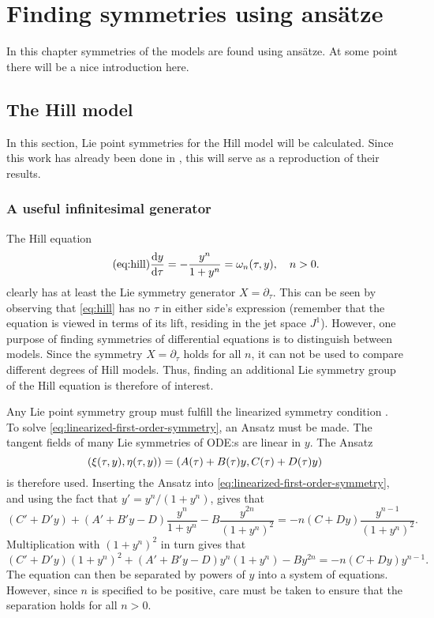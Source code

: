 \chapter{Finding symmetries using ansätze}

In this chapter symmetries of the models are found using ansätze.
At some point there will be a nice introduction here.

\section{The Hill model}

In this section, Lie point symmetries for the Hill model will be calculated.
Since this work has already been done in \cite{ohlsson2020symmetry}, this will serve as a reproduction of their results.

\subsection{A useful infinitesimal generator}

The Hill equation
\begin{equation} \tag{eq:hill}
  \dv{y}{\tau} = - \frac{y^n}{1 + y^n} = \omega_n(\tau, y), \quad
  n > 0.
\end{equation}
clearly has at least the Lie symmetry generator \(X=\partial_\tau\).
This can be seen by observing that \cref{eq:hill} has no \(\tau\) in either side's expression (remember that the equation is viewed in terms of its lift, residing in the jet space \(J^1\)).
However, one purpose of finding symmetries of differential equations is to distinguish between models.
Since the symmetry \(X=\partial_\tau\) holds for all \(n\), it can not be used to compare different degrees of Hill models.
Thus, finding an additional Lie symmetry group of the Hill equation is therefore of interest.

Any Lie point symmetry group must fulfill the linearized symmetry condition .
To solve \cref{eq:linearized-first-order-symmetry}, an Ansatz must be made.
The tangent fields of many Lie symmetries of ODE:s are linear in \(y\).
The Ansatz
\begin{equation}
  \pqty{\xi(\tau,y),\eta(\tau,y)} = \pqty{A(\tau) + B(\tau)y,C(\tau) + D(\tau)y}
\end{equation}
is therefore used.
Inserting the Ansatz into \cref{eq:linearized-first-order-symmetry}, and using the fact that \(y' = y^n / (1 + y^n)\), gives that
\begin{equation}
  (C' + D'y) + (A' + B'y - D) \frac{y^n}{1 + y^n} - B \frac{y^{2n}}{(1 + y^n)^2} =
  -n(C + Dy) \frac{y^{n-1}}{(1 + y^n)^2}.
\end{equation}
Multiplication with \((1 + y^n)^2\) in turn gives that
\begin{equation} \label{eq:hill-linear-symmetry}
  (C' + D'y)(1 + y^n)^2 + (A' + B'y - D)y^n(1 + y^n) - By^{2n} =
  -n(C + Dy) y^{n-1}.
\end{equation}
The equation can then be separated by powers of \(y\) into a system of equations.
However, since \(n\) is specified to be positive, care must be taken to ensure that the separation holds for all \(n>0\).

